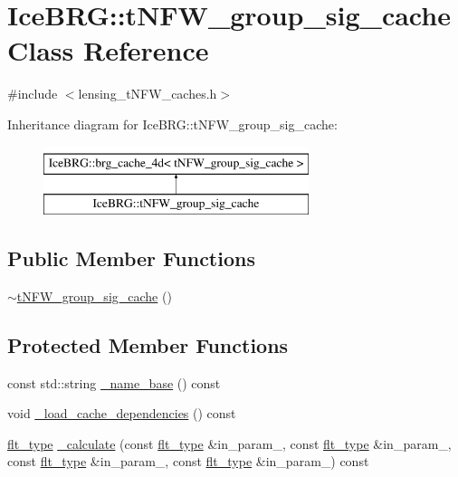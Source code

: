 \hypertarget{classIceBRG_1_1tNFW__group__sig__cache}{}\section{Ice\+B\+R\+G\+:\+:t\+N\+F\+W\+\_\+group\+\_\+sig\+\_\+cache Class Reference}
\label{classIceBRG_1_1tNFW__group__sig__cache}


{\ttfamily \#include $<$lensing\+\_\+t\+N\+F\+W\+\_\+caches.\+h$>$}

Inheritance diagram for Ice\+B\+R\+G\+:\+:t\+N\+F\+W\+\_\+group\+\_\+sig\+\_\+cache\+:\begin{figure}[H]
\begin{center}
\leavevmode
\includegraphics[height=2.000000cm]{classIceBRG_1_1tNFW__group__sig__cache}
\end{center}
\end{figure}
\subsection*{Public Member Functions}
\begin{DoxyCompactItemize}
\item 
\hyperlink{classIceBRG_1_1tNFW__group__sig__cache_a6a4dd7e7ab2356a0e74bccc6a03d46f1}{$\sim$t\+N\+F\+W\+\_\+group\+\_\+sig\+\_\+cache} ()
\end{DoxyCompactItemize}
\subsection*{Protected Member Functions}
\begin{DoxyCompactItemize}
\item 
const std\+::string \hyperlink{classIceBRG_1_1tNFW__group__sig__cache_af13fbfb83bf04be0e895ca3bd8f215a9}{\+\_\+name\+\_\+base} () const 
\item 
void \hyperlink{classIceBRG_1_1tNFW__group__sig__cache_a000f3c95c988adeedadb8f2acd32c950}{\+\_\+load\+\_\+cache\+\_\+dependencies} () const 
\item 
\hyperlink{lib_2IceBRG__main_2common_8h_ad0f130a56eeb944d9ef2692ee881ecc4}{flt\+\_\+type} \hyperlink{classIceBRG_1_1tNFW__group__sig__cache_ae679ace3d05bf7bbb8d8ef9ca74a67b3}{\+\_\+calculate} (const \hyperlink{lib_2IceBRG__main_2common_8h_ad0f130a56eeb944d9ef2692ee881ecc4}{flt\+\_\+type} \&in\+\_\+param\+\_, const \hyperlink{lib_2IceBRG__main_2common_8h_ad0f130a56eeb944d9ef2692ee881ecc4}{flt\+\_\+type} \&in\+\_\+param\+\_, const \hyperlink{lib_2IceBRG__main_2common_8h_ad0f130a56eeb944d9ef2692ee881ecc4}{flt\+\_\+type} \&in\+\_\+param\+\_, const \hyperlink{lib_2IceBRG__main_2common_8h_ad0f130a56eeb944d9ef2692ee881ecc4}{flt\+\_\+type} \&in\+\_\+param\+\_) const 
\end{DoxyCompactItemize}
